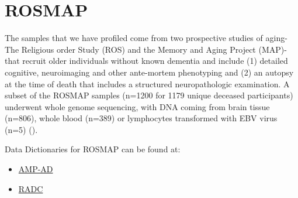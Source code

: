 \documentclass[]{book}
\providecommand{\tightlist}{%
  \setlength{\itemsep}{0pt}\setlength{\parskip}{0pt}}
\begin{document}
\hypertarget{rosmap}{%
\chapter{ROSMAP}\label{rosmap}}

The samples that we have profiled come from two prospective studies of aging-The Religious order Study (ROS) and the Memory and Aging Project (MAP)-that recruit older individuals without known dementia and include (1) detailed cognitive, neuroimaging and other ante-mortem phenotyping and (2) an autopsy at the time of death that includes a structured neuropathologic examination. A subset of the ROSMAP samples (n=1200 for 1179 unique deceased participants) underwent whole genome sequencing, with DNA coming from brain tissue (n=806), whole blood (n=389) or lymphocytes transformed with EBV virus (n=5) (\citet{10.1038/sdata.2018.142}).

Data Dictionaries for ROSMAP can be found at:

\begin{itemize}
\tightlist
\item
  \href{https://adknowledgeportal.synapse.org/Explore/Studies?Study=syn3219045}{AMP-AD}
\item
  \href{https://www.radc.rush.edu/docs/var/variables.htm}{RADC}
\end{itemize}
\end{document}

